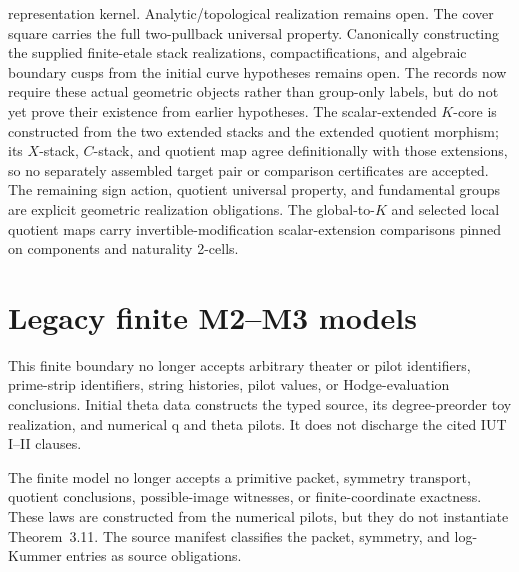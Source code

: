 \begin{definition}
  representation kernel.  Analytic/topological
  realization remains open.  The cover square carries the
  full two-pullback universal property.  Canonically constructing the supplied
  finite-etale stack realizations, compactifications, and algebraic boundary
  cusps from the initial curve hypotheses remains open.  The records now
  require these actual geometric objects rather than group-only labels, but do
  not yet prove their existence from earlier hypotheses.  The
  scalar-extended \(K\)-core is constructed from the two extended stacks and
  the extended quotient morphism; its \(X\)-stack, \(C\)-stack, and quotient
  map agree definitionally with those extensions, so no separately assembled
  target pair or comparison certificates are accepted.  The remaining sign
  action, quotient universal property, and fundamental groups are explicit
  geometric realization obligations.  The global-to-\(K\) and selected local
  quotient maps carry invertible-modification scalar-extension comparisons
  pinned on components and naturality 2-cells.
\end{definition}

\section{Legacy finite M2--M3 models}

\begin{definition}
  \label{def:iut-i-hodge-theater-realization-obligation}
  \leanok
  This finite boundary no longer accepts arbitrary theater or
  pilot identifiers, prime-strip identifiers, string histories, pilot values,
  or Hodge-evaluation conclusions.  Initial theta data constructs the typed
  source, its degree-preorder toy realization, and numerical q and theta
  pilots. It does not discharge the cited IUT I--II clauses.
\end{definition}

\begin{definition}
  \label{def:constructed-theorem-311-obligation}
  \leanok
  The finite model no longer accepts a primitive packet,
  symmetry transport, quotient conclusions, possible-image witnesses, or
  finite-coordinate exactness. These laws are constructed from the numerical
  pilots, but they do not instantiate Theorem~3.11. The source manifest
  classifies the packet, symmetry, and log-Kummer entries as source
  obligations.
\end{definition}

